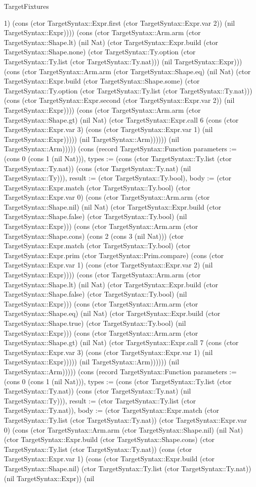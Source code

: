 \begin{lexlean}{TargetFixtures}
\begin{semanticmodule}
{1) (cons (ctor TargetSyntax::Expr.first (ctor TargetSyntax::Expr.var 2)) (nil TargetSyntax::Expr)))) (cons (ctor TargetSyntax::Arm.arm (ctor TargetSyntax::Shape.lt) (nil Nat) (ctor TargetSyntax::Expr.build (ctor TargetSyntax::Shape.none) (ctor TargetSyntax::Ty.option (ctor TargetSyntax::Ty.list (ctor TargetSyntax::Ty.nat))) (nil TargetSyntax::Expr))) (cons (ctor TargetSyntax::Arm.arm (ctor TargetSyntax::Shape.eq) (nil Nat) (ctor TargetSyntax::Expr.build (ctor TargetSyntax::Shape.some) (ctor TargetSyntax::Ty.option (ctor TargetSyntax::Ty.list (ctor TargetSyntax::Ty.nat))) (cons (ctor TargetSyntax::Expr.second (ctor TargetSyntax::Expr.var 2)) (nil TargetSyntax::Expr)))) (cons (ctor TargetSyntax::Arm.arm (ctor TargetSyntax::Shape.gt) (nil Nat) (ctor TargetSyntax::Expr.call 6 (cons (ctor TargetSyntax::Expr.var 3) (cons (ctor TargetSyntax::Expr.var 1) (nil TargetSyntax::Expr))))) (nil TargetSyntax::Arm)))))) (nil TargetSyntax::Arm))))}) (cons (record TargetSyntax::Function {parameters := (cons 0 (cons 1 (nil Nat))), types := (cons (ctor TargetSyntax::Ty.list (ctor TargetSyntax::Ty.nat)) (cons (ctor TargetSyntax::Ty.nat) (nil TargetSyntax::Ty))), result := (ctor TargetSyntax::Ty.bool), body := (ctor TargetSyntax::Expr.match (ctor TargetSyntax::Ty.bool) (ctor TargetSyntax::Expr.var 0) (cons (ctor TargetSyntax::Arm.arm (ctor TargetSyntax::Shape.nil) (nil Nat) (ctor TargetSyntax::Expr.build (ctor TargetSyntax::Shape.false) (ctor TargetSyntax::Ty.bool) (nil TargetSyntax::Expr))) (cons (ctor TargetSyntax::Arm.arm (ctor TargetSyntax::Shape.cons) (cons 2 (cons 3 (nil Nat))) (ctor TargetSyntax::Expr.match (ctor TargetSyntax::Ty.bool) (ctor TargetSyntax::Expr.prim (ctor TargetSyntax::Prim.compare) (cons (ctor TargetSyntax::Expr.var 1) (cons (ctor TargetSyntax::Expr.var 2) (nil TargetSyntax::Expr)))) (cons (ctor TargetSyntax::Arm.arm (ctor TargetSyntax::Shape.lt) (nil Nat) (ctor TargetSyntax::Expr.build (ctor TargetSyntax::Shape.false) (ctor TargetSyntax::Ty.bool) (nil TargetSyntax::Expr))) (cons (ctor TargetSyntax::Arm.arm (ctor TargetSyntax::Shape.eq) (nil Nat) (ctor TargetSyntax::Expr.build (ctor TargetSyntax::Shape.true) (ctor TargetSyntax::Ty.bool) (nil TargetSyntax::Expr))) (cons (ctor TargetSyntax::Arm.arm (ctor TargetSyntax::Shape.gt) (nil Nat) (ctor TargetSyntax::Expr.call 7 (cons (ctor TargetSyntax::Expr.var 3) (cons (ctor TargetSyntax::Expr.var 1) (nil TargetSyntax::Expr))))) (nil TargetSyntax::Arm)))))) (nil TargetSyntax::Arm))))}) (cons (record TargetSyntax::Function {parameters := (cons 0 (cons 1 (nil Nat))), types := (cons (ctor TargetSyntax::Ty.list (ctor TargetSyntax::Ty.nat)) (cons (ctor TargetSyntax::Ty.nat) (nil TargetSyntax::Ty))), result := (ctor TargetSyntax::Ty.list (ctor TargetSyntax::Ty.nat)), body := (ctor TargetSyntax::Expr.match (ctor TargetSyntax::Ty.list (ctor TargetSyntax::Ty.nat)) (ctor TargetSyntax::Expr.var 0) (cons (ctor TargetSyntax::Arm.arm (ctor TargetSyntax::Shape.nil) (nil Nat) (ctor TargetSyntax::Expr.build (ctor TargetSyntax::Shape.cons) (ctor TargetSyntax::Ty.list (ctor TargetSyntax::Ty.nat)) (cons (ctor TargetSyntax::Expr.var 1) (cons (ctor TargetSyntax::Expr.build (ctor TargetSyntax::Shape.nil) (ctor TargetSyntax::Ty.list (ctor TargetSyntax::Ty.nat)) (nil TargetSyntax::Expr)) (nil }
\end{semanticmodule}
\end{lexlean}
